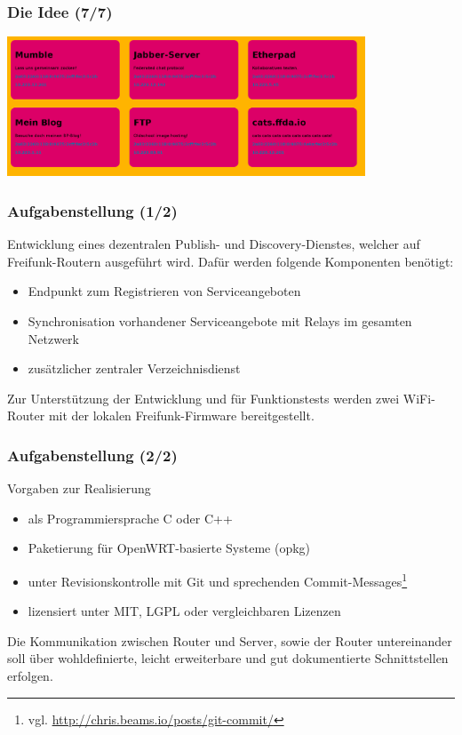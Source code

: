 \documentclass[accentcolor=tud6b,colorbacktitle,inverttitle,landscape,german,presentation,t]{tudbeamer}
\begin{document}
	\begin{frame}
		\frametitle{Die Idee (7/7)}
		\begin{center}
			\vspace{0cm}
			\includegraphics[width=0.8\textwidth]{images/service-discovery7}
			\vspace{0.4cm}
		\end{center}
		
	\end{frame}
	\begin{frame}
		\frametitle{Aufgabenstellung (1/2)}
			Entwicklung eines dezentralen Publish- und Discovery-Dienstes, welcher auf Freifunk-Routern ausgeführt wird.
			\vfill
			\pause
			Dafür werden folgende Komponenten benötigt:
			\begin{itemize}
			\item Endpunkt zum Registrieren von Serviceangeboten
			\item Synchronisation vorhandener Serviceangebote mit Relays im gesamten Netzwerk
			\item zusätzlicher zentraler Verzeichnisdienst
			\end{itemize}
			\vfill
			\pause
			Zur Unterstützung der Entwicklung und für Funktionstests werden zwei WiFi-Router mit der lokalen Freifunk-Firmware bereitgestellt.
	\end{frame}
	
	\begin{frame}
		\frametitle{Aufgabenstellung (2/2)}
		\vfill
		Vorgaben zur Realisierung
		\begin{itemize}
			\item als Programmiersprache C oder C++
			\item Paketierung für OpenWRT-basierte Systeme (opkg)
			\item unter Revisionskontrolle mit Git und sprechenden Commit-Messages\footnote{vgl. \url{http://chris.beams.io/posts/git-commit/}}
			\item lizensiert unter MIT, LGPL oder vergleichbaren Lizenzen
		\end{itemize}
		\vfill
		\pause
		Die Kommunikation zwischen Router und Server, sowie der Router untereinander soll über wohldefinierte, leicht erweiterbare und gut dokumentierte Schnittstellen erfolgen.
		\vfill
	\end{frame}
	
\end{document}
